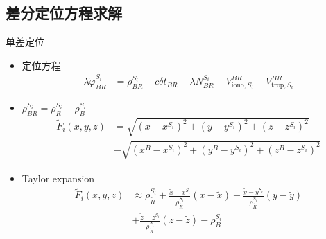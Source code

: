 \subsection{差分定位方程求解}
\begin{frame}{单差定位}
    \begin{itemize}
        \item 定位方程
        \begin{align*}
            \lambda \tilde \varphi _ { BR } ^ { S _ i } &= \rho _ { BR } ^ { S _ i } - c \delta t _ { BR }
            - \lambda N _ { BR } ^ { S _ i } - V _ { \mathrm{ iono }, S _ i } ^ { BR } - V _ { \mathrm{ trop }, S _ i } ^ { BR }
        \end{align*}
        \item $\rho _ { BR } ^ { S _ i } = \rho _ R ^ { S _ i } - \rho _ B ^ { S _ i }$
        \begin{align*}
            \tilde F _ i \left( x, y, z \right) &= \sqrt{ \left( x - x ^ { S _ i } \right) ^ 2 
            + \left( y - y ^ { S _ i } \right) ^ 2 + \left( z - z ^ { S _ i } \right) ^ 2 } \\
            &- \sqrt{ \left( x ^ B - x ^ { S _ i } \right) ^ 2 + \left( y ^ B - y ^ { S _ i } \right) ^ 2 + \left( z ^ B - z ^ { S _ i } \right) ^ 2 }
        \end{align*}
        \item Taylor expansion
        \begin{align*}
            \tilde F _ i \left( x, y, z \right) &\approx \rho _ { \tilde R } ^ { S _ i }
            + \frac{ \tilde x - x ^ { S _ i } }{ \rho _ { \tilde R } ^ { S _ i } } \left( x - \tilde x \right)
            + \frac{ \tilde y - y ^ { S _ i } }{ \rho _ { \tilde R } ^ { S _ i } } \left( y - \tilde y \right) \\
            &+ \frac{ \tilde z - z ^ { S _ i } }{ \rho _ { \tilde R } ^ { S _ i } } \left( z - \tilde z \right)
            - \rho _ B ^ { S _ i }
        \end{align*}
    \end{itemize}
\end{frame}

